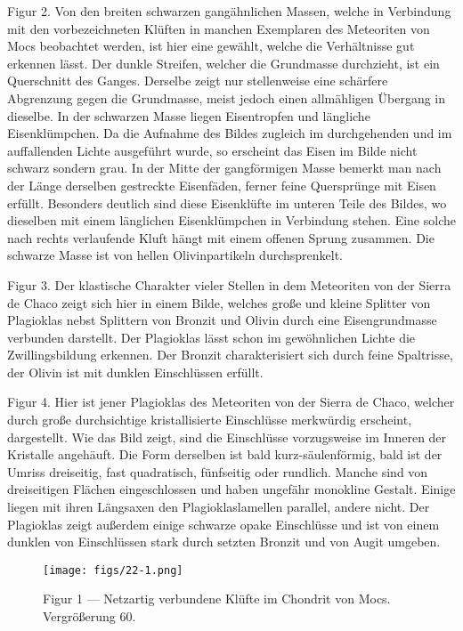 \documentclass[a4paper, 11pt, oneside, polutonikogreek, german]{article}
\begin{document}
Figur 2. Von den breiten schwarzen gangähnlichen Massen, welche in Verbindung mit den vorbezeichneten Klüften in manchen Exemplaren des Meteoriten von Mocs beobachtet werden, ist hier eine gewählt, welche die Verhältnisse gut erkennen lässt. Der dunkle Streifen, welcher die Grundmasse durchzieht, ist ein Querschnitt des Ganges. Derselbe zeigt nur stellenweise eine schärfere Abgrenzung gegen die Grundmasse, meist jedoch einen allmähligen Übergang in dieselbe. In der schwarzen Masse liegen Eisentropfen und längliche Eisenklümpchen. Da die Aufnahme des Bildes zugleich im durchgehenden und im auffallenden Lichte ausgeführt wurde, so erscheint das Eisen im Bilde nicht schwarz sondern grau. In der Mitte der gangförmigen Masse bemerkt man nach der Länge derselben gestreckte Eisenfäden, ferner feine Quersprünge mit Eisen erfüllt. Besonders deutlich sind diese Eisenklüfte im unteren Teile des Bildes, wo dieselben mit einem länglichen Eisenklümpchen in Verbindung stehen. Eine solche nach rechts verlaufende Kluft hängt mit einem offenen Sprung zusammen. Die schwarze Masse ist von hellen Olivinpartikeln durchsprenkelt.

Figur 3. Der klastische Charakter vieler Stellen in dem Meteoriten von der Sierra de Chaco zeigt sich hier in einem Bilde, welches große und kleine Splitter von Plagioklas nebst Splittern von Bronzit und Olivin durch eine Eisengrundmasse verbunden darstellt. Der Plagioklas lässt schon im gewöhnlichen Lichte die Zwillingsbildung erkennen. Der Bronzit charakterisiert sich durch feine Spaltrisse, der Olivin ist mit dunklen Einschlüssen erfüllt.

Figur 4. Hier ist jener Plagioklas des Meteoriten von der Sierra de Chaco, welcher durch große durchsichtige kristallisierte Einschlüsse merkwürdig erscheint, dargestellt. Wie das Bild zeigt, sind die Einschlüsse vorzugsweise im Inneren der Kristalle angehäuft. Die Form derselben ist bald kurz-säulenförmig, bald ist der Umriss dreiseitig, fast quadratisch, fünfseitig oder rundlich. Manche sind von dreiseitigen Flächen eingeschlossen und haben ungefähr monokline Gestalt. Einige liegen mit ihren Längsaxen den Plagioklaslamellen parallel, andere nicht. Der Plagioklas zeigt außerdem einige schwarze opake Einschlüsse und ist von einem dunklen von Einschlüssen stark durch setzten Bronzit und von Augit umgeben.
\clearpage

\vspace*{\fill}
\begin{figure}[H]
\centering
\texttt{[image: figs/22-1.png]}
\caption{\small Figur 1 --- Netzartig verbundene Klüfte im Chondrit von Mocs. Vergrößerung 60.}
\end{figure}
\vspace*{\fill}
\clearpage
\end{document}
